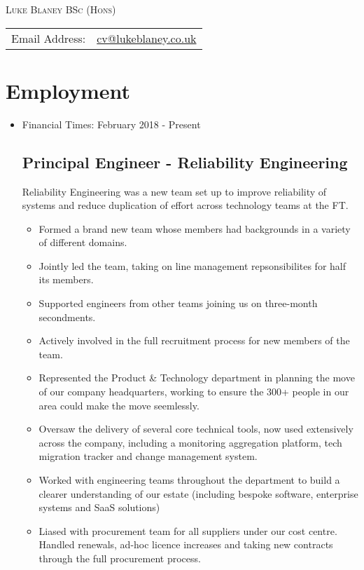 \documentclass[a4paper]{article}
\begin{document}
\begin{center}\textsc{\LARGE Luke Blaney BSc (Hons)}\end{center}

\begin{tabular}{ l l }

Email Address: & \href{mailto:cv@lukeblaney.co.uk}{cv@lukeblaney.co.uk}\\

\end{tabular}

\section*{Employment}


\begin{itemize}

\item Financial Times: February 2018 - Present
\subsection*{Principal Engineer - Reliability Engineering}
Reliability Engineering was a new team set up to improve reliability of systems and reduce duplication of effort across technology teams at the FT.

\begin{itemize}
	\item Formed a brand new team whose members had backgrounds in a variety of different domains.
	\item Jointly led the team, taking on line management repsonsibilites for half its members.
	\item Supported engineers from other teams joining us on three-month secondments.
	\item Actively involved in the full recruitment process for new members of the team.
	\item Represented the Product \& Technology department in planning the move of our company headquarters, working to ensure the 300+ people in our area could make the move seemlessly.
	\item Oversaw the delivery of several core technical tools, now used extensively across the company, including a monitoring aggregation platform, tech migration tracker and change management system.
	\item Worked with engineering teams throughout the department to build a clearer understanding of our estate (including bespoke software, enterprise systems and SaaS solutions)
	\item Liased with procurement team for all suppliers under our cost centre.  Handled renewals, ad-hoc licence increases and taking new contracts through the full procurement process.
\end{itemize}


\end{itemize}
\end{document}
